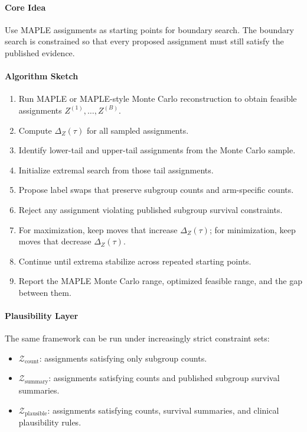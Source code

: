 \documentclass[11pt]{article}
\begin{document}
\paragraph*{Core Idea}

Use MAPLE assignments as starting points for boundary search. The boundary search is constrained so that every proposed assignment must still satisfy the published evidence.

\paragraph*{Algorithm Sketch}

\begin{enumerate}
\item Run MAPLE or MAPLE-style Monte Carlo reconstruction to obtain feasible assignments \(Z^{(1)},\ldots,Z^{(B)}\).
\item Compute \(\Delta_Z(\tau)\) for all sampled assignments.
\item Identify lower-tail and upper-tail assignments from the Monte Carlo sample.
\item Initialize extremal search from those tail assignments.
\item Propose label swaps that preserve subgroup counts and arm-specific counts.
\item Reject any assignment violating published subgroup survival constraints.
\item For maximization, keep moves that increase \(\Delta_Z(\tau)\); for minimization, keep moves that decrease \(\Delta_Z(\tau)\).
\item Continue until extrema stabilize across repeated starting points.
\item Report the MAPLE Monte Carlo range, optimized feasible range, and the gap between them.
\end{enumerate}

\paragraph*{Plausibility Layer}

The same framework can be run under increasingly strict constraint sets:

\begin{itemize}
\item \(\mathcal Z_{\text{count}}\): assignments satisfying only subgroup counts.
\item \(\mathcal Z_{\text{summary}}\): assignments satisfying counts and published subgroup survival summaries.
\item \(\mathcal Z_{\text{plausible}}\): assignments satisfying counts, survival summaries, and clinical plausibility rules.
\end{itemize}
\end{document}
